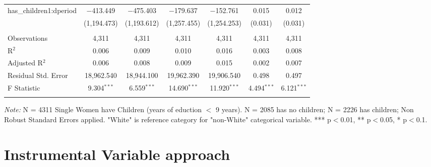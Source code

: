 \documentclass[a4paper]{article}
\begin{document}
\begin{table}[!htbp]
\begin{adjustwidth}{0.cm}{-0cm}
\begin{threeparttable}
\begin{tabular}{@{\extracolsep{3pt}}lcccccc}
  has\_children1:dperiod & $-$413.449 & $-$475.403 & $-$179.637 & $-$152.761 & 0.015 & 0.012 \\ 
  & (1,194.473) & (1,193.612) & (1,257.455) & (1,254.253) & (0.031) & (0.031) \\ 
 \hline \\[-1.8ex] 
Observations & 4,311 & 4,311 & 4,311 & 4,311 & 4,311 & 4,311 \\ 
R$^{2}$ & 0.006 & 0.009 & 0.010 & 0.016 & 0.003 & 0.008 \\ 
Adjusted R$^{2}$ & 0.006 & 0.008 & 0.009 & 0.015 & 0.002 & 0.007 \\ 
Residual Std. Error & 18,962.540 & 18,944.100 & 19,962.390  & 19,906.540  & 0.498  & 0.497 \\ 
F Statistic & 9.304$^{***}$ & 6.559$^{***}$  & 14.690$^{***}$ & 11.920$^{***}$ & 4.494$^{***}$ & 6.121$^{***}$  \\ 
\hline 
\hline \\[-3.5ex] 
\end{tabular} 
\begin{tablenotes}
      \small
      \item\textit{Note:} N = 4311 Single Women have Children (years of eduction $<$ 9 years). N = 2085 has no children; N = 2226 has children; Non Robust Standard Errors applied. "White" is reference category for "non-White" categorical variable. *** p$<$0.01, ** p$<$0.05, * p$<$0.1.
    \end{tablenotes}
\end{threeparttable}
\end{adjustwidth}
%
\end{table}

\section{Instrumental Variable approach}
\end{document}
